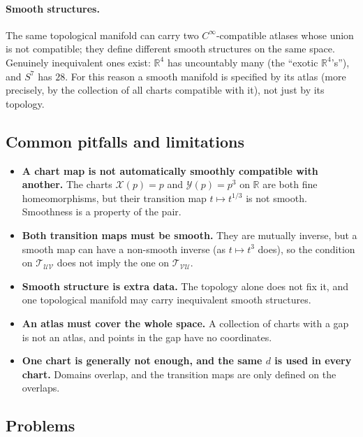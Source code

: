 \documentclass[11pt]{article}
\begin{document}
\paragraph{Smooth structures.} The same topological manifold can carry two $C^\infty$-compatible atlases whose union is not compatible; they define different smooth structures on the same space. Genuinely inequivalent ones exist: $\mathbb R^4$ has uncountably many (the ``exotic $\mathbb R^4$'s''), and $S^7$ has $28$. For this reason a smooth manifold is specified by its atlas (more precisely, by the collection of all charts compatible with it), not just by its topology.

\subsection*{Common pitfalls and limitations}

\begin{itemize}
  \item \textbf{A chart map is not automatically smoothly compatible with another.} The charts $\mathcal X(p)=p$ and $\mathcal Y(p)=p^3$ on $\mathbb R$ are both fine homeomorphisms, but their transition map $t\mapsto t^{1/3}$ is not smooth. Smoothness is a property of the pair.
  \item \textbf{Both transition maps must be smooth.} They are mutually inverse, but a smooth map can have a non-smooth inverse (as $t\mapsto t^3$ does), so the condition on $\mathcal T_{\mathcal{UV}}$ does not imply the one on $\mathcal T_{\mathcal{VU}}$.
  \item \textbf{Smooth structure is extra data.} The topology alone does not fix it, and one topological manifold may carry inequivalent smooth structures.
  \item \textbf{An atlas must cover the whole space.} A collection of charts with a gap is not an atlas, and points in the gap have no coordinates.
  \item \textbf{One chart is generally not enough, and the same $d$ is used in every chart.} Domains overlap, and the transition maps are only defined on the overlaps.
\end{itemize}

\subsection*{Problems}
\end{document}

